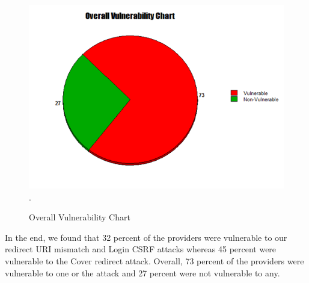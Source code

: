 \begin{figure}[t]
   		 \centering
   		 \includegraphics[width=\columnwidth]{figures/overall.png}.
   		 \caption{Overall Vulnerability Chart }
   		 \label{fig:overall}
\end{figure}

In the end, we found that 32 percent of the providers were vulnerable to our redirect URI mismatch and Login CSRF attacks whereas 45 percent were vulnerable to the Cover redirect attack. Overall, 73 percent of the providers were vulnerable to one or the attack and 27 percent were not vulnerable to any.

